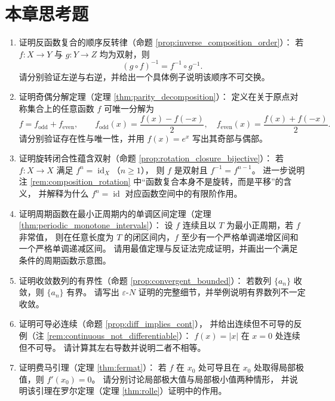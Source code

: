 \section*{本章思考题}

\begin{enumerate}[leftmargin=3em, label=\textbf{题 \arabic*}]
    \item 证明反函数复合的顺序反转律（命题 \ref{prop:inverse_composition_order}）：
    若 $f:X\to Y$ 与 $g:Y\to Z$ 均为双射，则
    \[
    (g\circ f)^{-1}=f^{-1}\circ g^{-1}.
    \]
    请分别验证左逆与右逆，并给出一个具体例子说明该顺序不可交换。

    \item 证明奇偶分解定理（定理 \ref{thm:parity_decomposition}）：
    定义在关于原点对称集合上的任意函数 $f$ 可唯一分解为
    \[
    f=f_{\text{odd}}+f_{\text{even}},\qquad
    f_{\text{odd}}(x)=\frac{f(x)-f(-x)}{2},\quad
    f_{\text{even}}(x)=\frac{f(x)+f(-x)}{2}.
    \]
    请分别验证存在性与唯一性，并用 $f(x)=e^x$ 写出其奇部与偶部。

    \item 证明旋转闭合性蕴含双射（命题 \ref{prop:rotation_closure_bijective}）：
    若 $f:X\to X$ 满足 $f^n=\operatorname{id}_X$（$n\ge1$），
    则 $f$ 是双射且 $f^{-1}=f^{n-1}$。
    进一步说明注 \ref{rem:composition_rotation} 中“函数复合本身不是旋转，而是平移”的含义，
    并解释为什么 $f^n=\operatorname{id}$ 对应函数空间中的有限阶作用。

    \item 证明周期函数在最小正周期内的单调区间定理（定理 \ref{thm:periodic_monotone_intervals}）：
    设 $f$ 连续且以 $T$ 为最小正周期，若 $f$ 非常值，
    则在任意长度为 $T$ 的闭区间内，$f$ 至少有一个严格单调递增区间和一个严格单调递减区间。
    请用最值定理与反证法完成证明，并画出一个满足条件的周期函数示意图。

    \item 证明收敛数列的有界性（命题 \ref{prop:convergent_bounded}）：
    若数列 $\{a_n\}$ 收敛，则 $\{a_n\}$ 有界。
    请写出 $\varepsilon$-$N$ 证明的完整细节，并举例说明有界数列不一定收敛。

    \item 证明可导必连续（命题 \ref{prop:diff_implies_cont}），
    并给出连续但不可导的反例（注 \ref{rem:continuous_not_differentiable}）：
    $f(x)=|x|$ 在 $x=0$ 处连续但不可导。
    请计算其左右导数并说明二者不相等。

    \item 证明费马引理（定理 \ref{thm:fermat}）：
    若 $f$ 在 $x_0$ 处可导且在 $x_0$ 处取得局部极值，则 $f'(x_0)=0$。
    请分别讨论局部极大值与局部极小值两种情形，
    并说明该引理在罗尔定理（定理 \ref{thm:rolle}）证明中的作用。


\end{enumerate}
